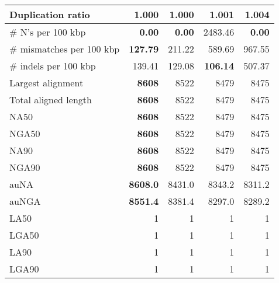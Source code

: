 \documentclass[12pt,a4paper]{article}
\begin{document}
\begin{table}[ht]
\begin{center}
\begin{tabular}{|l*{4}{|r}|}
Duplication ratio & {\bf 1.000} & {\bf 1.000} & 1.001 & 1.004 \\ \hline
\# N's per 100 kbp & {\bf 0.00} & {\bf 0.00} & 2483.46 & {\bf 0.00} \\ \hline
\# mismatches per 100 kbp & {\bf 127.79} & 211.22 & 589.69 & 967.55 \\ \hline
\# indels per 100 kbp & 139.41 & 129.08 & {\bf 106.14} & 507.37 \\ \hline
Largest alignment & {\bf 8608} & 8522 & 8479 & 8475 \\ \hline
Total aligned length & {\bf 8608} & 8522 & 8479 & 8475 \\ \hline
NA50 & {\bf 8608} & 8522 & 8479 & 8475 \\ \hline
NGA50 & {\bf 8608} & 8522 & 8479 & 8475 \\ \hline
NA90 & {\bf 8608} & 8522 & 8479 & 8475 \\ \hline
NGA90 & {\bf 8608} & 8522 & 8479 & 8475 \\ \hline
auNA & {\bf 8608.0} & 8431.0 & 8343.2 & 8311.2 \\ \hline
auNGA & {\bf 8551.4} & 8381.4 & 8297.0 & 8289.2 \\ \hline
LA50 & 1 & 1 & 1 & 1 \\ \hline
LGA50 & 1 & 1 & 1 & 1 \\ \hline
LA90 & 1 & 1 & 1 & 1 \\ \hline
LGA90 & 1 & 1 & 1 & 1 \\ \hline
\end{tabular}
\end{center}
\end{table}
\end{document}

